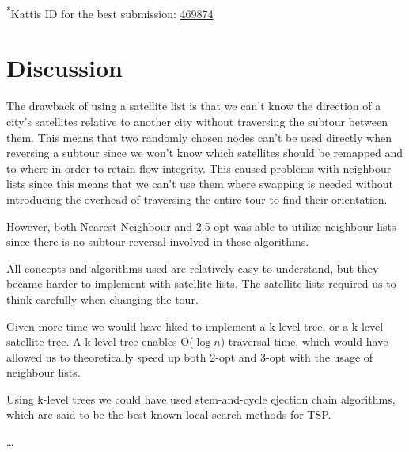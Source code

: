 \documentclass[paper=a4, fontsize=11pt,numbers=endperiod]{scrartcl} %
\numberwithin{equation}{section} %
\numberwithin{figure}{section} %
\numberwithin{table}{section} %
\begin{document}
\textsuperscript{*}Kattis ID for the best submission: \href{https://kth.kattis.scrool.se/submission?id=469874}{469874}






\section{Discussion}


The drawback of using a satellite list is that we can't know the direction of a city's satellites relative to another city without traversing the subtour between them.
This means that two randomly chosen nodes can't be used directly when reversing a subtour since we won't know which satellites should be remapped and to where in order to retain flow integrity.
This caused problems with neighbour lists since this means that we can't use them where swapping is needed without introducing the overhead of traversing the entire tour to find their orientation.

However, both Nearest Neighbour and 2.5-opt was able to utilize neighbour lists since there is no subtour reversal involved in these algorithms.

All concepts and algorithms used are relatively easy to understand, but they became harder to implement with satellite lists.
The satellite lists required us to think carefully when changing the tour.


Given more time we would have liked to implement a k-level tree, or a k-level satellite tree.
A k-level tree enables O($\log{n}$) traversal time, which would have allowed us to theoretically speed up both 2-opt and 3-opt with the usage of neighbour lists.

Using k-level trees we could have used stem-and-cycle ejection chain algorithms, which are said to be the best known local search methods for TSP.\cite{stem-cycle}

\dots

\end{document}
